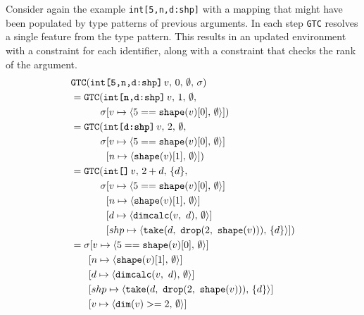 \noindent
Consider again the example \texttt{int[5,n,d:shp]} with a mapping \cenv{} that might have been populated by type patterns of previous arguments.
In each step \texttt{GTC} resolves a single feature from the type pattern.
This results in an updated environment with a constraint for each identifier, along with a constraint that checks the rank of the argument.
{\allowdisplaybreaks
\begin{align*}
    &\gtc{\texttt{int[\textbf{5},n,d:shp]}}{0}{\emptyset}{\cenv} \\
    &= \gtc{\texttt{int[\textbf{n},d:shp]}}{1}{\emptyset}{
        \\ &\hspace{3em} \cenv
        \envmap{v}{\emptyset}{5 == \texttt{shape}(v)[0]}
    } \\
    &= \gtc{\texttt{int[\textbf{d:shp}]}}{2}{\emptyset}{
        \\ &\hspace{3em} \cenv
        \envmap{v}{\emptyset}{5 == \texttt{shape}(v)[0]}
        \\ &\hspace{3.6em}
        \envmap{n}{\emptyset}{\texttt{shape}(v)[1]}
    } \\
    &= \gtc{\texttt{int[]}}{2+d}{\{d\}}{
        \\ &\hspace{3em} \cenv
        \envmap{v}{\emptyset}{5 == \texttt{shape}(v)[0]}
        \\ &\hspace{3.6em}
        \envmap{n}{\emptyset}{\texttt{shape}(v)[1]}
        \\ &\hspace{3.6em}
        \envmap{d}{\emptyset}{\texttt{dimcalc}(v,\ d)}
        \\ &\hspace{3.6em}
        \envmap{shp}{\{d\}}{\texttt{take}(d,\ \texttt{drop}(2,\ \texttt{shape}(v)))}
    } \\
    &= \cenv
        \envmap{v}{\emptyset}{5 == \texttt{shape}(v)[0]}
        \\ &\hspace{1.8em}
        \envmap{n}{\emptyset}{\texttt{shape}(v)[1]}
        \\ &\hspace{1.8em}
        \envmap{d}{\emptyset}{\texttt{dimcalc}(v,\ d)}
        \\ &\hspace{1.8em}
        \envmap{shp}{\{d\}}{\texttt{take}(d,\ \texttt{drop}(2,\ \texttt{shape}(v)))}
        \\ &\hspace{1.8em}
        \envmap{v}{\emptyset}{\texttt{dim}(v) >= 2}
\end{align*}}
